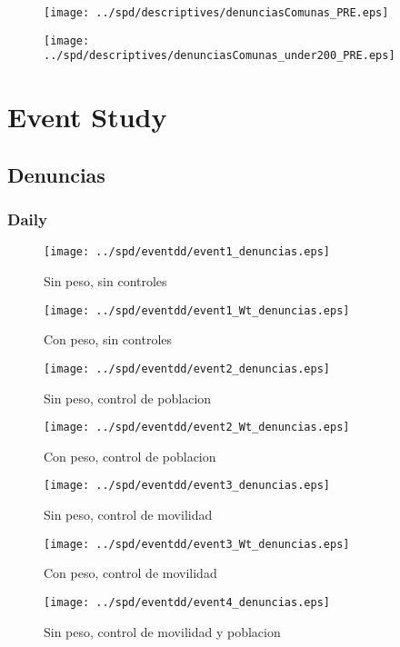 \documentclass[11pt,letterpaper]{article}
\begin{document}
\begin{figure}[hbtp]
\caption{}
\centering
\texttt{[image: ../spd/descriptives/denunciasComunas\_PRE.eps]}
\end{figure}

\begin{figure}[hbtp]
\caption{}
\centering
\texttt{[image: ../spd/descriptives/denunciasComunas\_under200\_PRE.eps]}
\end{figure}

\section{Event Study}
	\subsection{Denuncias}
		\subsubsection{Daily}
\begin{figure}[hbtp]
\caption{Sin peso, sin controles}
\centering
\texttt{[image: ../spd/eventdd/event1\_denuncias.eps]}
\end{figure}

\begin{figure}[hbtp]
\caption{Con peso, sin controles}
\centering
\texttt{[image: ../spd/eventdd/event1\_Wt\_denuncias.eps]}
\end{figure}
\begin{figure}[hbtp]
\caption{Sin peso, control de poblacion}
\centering
\texttt{[image: ../spd/eventdd/event2\_denuncias.eps]}
\end{figure}

\begin{figure}[hbtp]
\caption{Con peso, control de poblacion}
\centering
\texttt{[image: ../spd/eventdd/event2\_Wt\_denuncias.eps]}
\end{figure}
\begin{figure}[hbtp]
\caption{Sin peso, control de movilidad}
\centering
\texttt{[image: ../spd/eventdd/event3\_denuncias.eps]}
\end{figure}

\begin{figure}[hbtp]
\caption{Con peso, control de movilidad}
\centering
\texttt{[image: ../spd/eventdd/event3\_Wt\_denuncias.eps]}
\end{figure}
\begin{figure}[hbtp]
\caption{Sin peso, control de movilidad y poblacion}
\centering
\texttt{[image: ../spd/eventdd/event4\_denuncias.eps]}
\end{figure}
\end{document}

